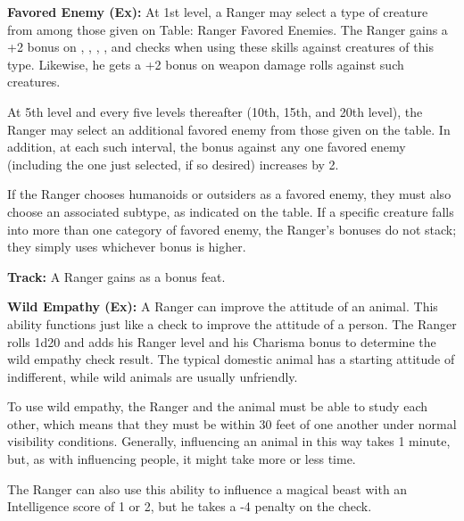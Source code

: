 \textbf{Favored Enemy (Ex):} At 1st level, a Ranger may select a type of creature from among those given on Table: Ranger Favored Enemies. The Ranger gains a +2 bonus on , , , , and  checks when using these skills against creatures of this type. Likewise, he gets a +2 bonus on weapon damage rolls against such creatures.

At 5th level and every five levels thereafter (10th, 15th, and 20th level), the Ranger may select an additional favored enemy from those given on the table. In addition, at each such interval, the bonus against any one favored enemy (including the one just selected, if so desired) increases by 2. 

If the Ranger chooses humanoids or outsiders as a favored enemy, they must also choose an associated subtype, as indicated on the table. If a specific creature falls into more than one category of favored enemy, the Ranger's bonuses do not stack; they simply uses whichever bonus is higher.

\textbf{Track:} A Ranger gains  as a bonus feat.

\textbf{Wild Empathy (Ex):} A Ranger can improve the attitude of an animal. This ability functions just like a  check to improve the attitude of a person. The Ranger rolls 1d20 and adds his Ranger level and his Charisma bonus to determine the wild empathy check result. The typical domestic animal has a starting attitude of indifferent, while wild animals are usually unfriendly.

To use wild empathy, the Ranger and the animal must be able to study each other, which means that they must be within 30 feet of one another under normal visibility conditions. Generally, influencing an animal in this way takes 1 minute, but, as with influencing people, it might take more or less time.

The Ranger can also use this ability to influence a magical beast with an Intelligence score of 1 or 2, but he takes a -4 penalty on the check.

